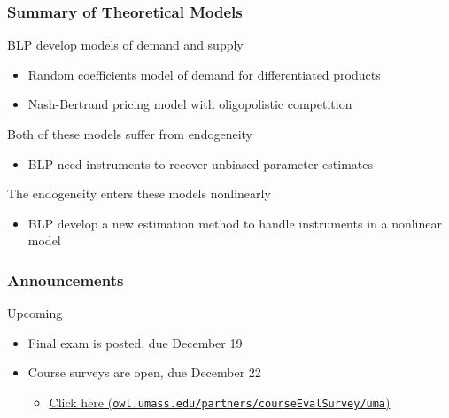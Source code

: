 \documentclass{beamer}
\begin{document}
\begin{frame}\frametitle{Summary of Theoretical Models}
    BLP develop models of demand and supply
    \begin{itemize}
        \item Random coefficients model of demand for differentiated products
        \item Nash-Bertrand pricing model with oligopolistic competition
    \end{itemize}
    \vspace{2ex}
    Both of these models suffer from endogeneity
    \begin{itemize}
        \item BLP need instruments to recover unbiased parameter estimates
    \end{itemize}
    \vspace{2ex}
    The endogeneity enters these models nonlinearly
    \begin{itemize}
        \item BLP develop a new estimation method to handle instruments in a nonlinear model
    \end{itemize}
\end{frame}

\begin{frame}\frametitle{Announcements}
    Upcoming
    \begin{itemize}
        \item Final exam is posted, due December 19
        \item Course surveys are open, due December 22
        \begin{itemize}
            \item \href{http://owl.umass.edu/partners/courseEvalSurvey/uma/}{Click here (\texttt{owl.umass.edu/partners/courseEvalSurvey/uma})}
        \end{itemize}
    \end{itemize}
\end{frame}
\end{document}

